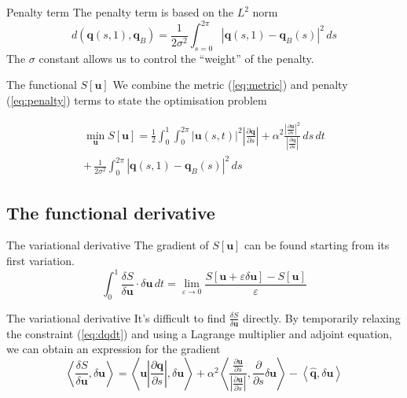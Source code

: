 \documentclass{beamer}
\newcommand{\eq}[1]{(\ref{eq:#1})}
\newcommand{\vect}[1]{\ensuremath{\mathbf{#1}}}
\newcommand{\hvect}[1]{\ensuremath{\hat{\vect{#1}}}}
\newcommand{\pp}[2]{\frac{\partial #1}{\partial #2}}
\newcommand{\vv}[2]{\frac{\delta #1}{\delta #2}}
\newcommand{\angles}[1]{\left\langle #1 \right\rangle}
\newcommand{\eps}{\varepsilon}
\begin{document}
\begin{frame}{Penalty term}
The penalty term is based on the $L^2$ norm
\begin{equation}
  \label{eq:penalty}
  d(\vect q(s,1),\vect q_B) = \frac{1}{2\sigma^2}\int^{2\pi}_{s=0}\left| \vect q(s,1) -
    \vect q_B(s)\right|^2\,ds
\end{equation}
The $\sigma$ constant allows us to control the ``weight'' of the penalty.
\end{frame}



\begin{frame}{The functional $S[\vect u]$}
We combine the metric \eq{metric} and penalty \eq{penalty} terms to
state the optimisation problem

\begin{equation}
  \begin{split}
  \min_{\vect u} S[\vect u] = \frac{1}{2} \int^{1}_{0} \int^{2\pi}_{0}\left| \vect u(s,t) \right|^2 
  \left| \frac{\partial \vect q}{\partial s} \right|  + 
  \alpha^2 \frac{ 
    \left| \frac{\partial \vect u}{\partial s}\right|^2}{
    \left| \frac{\partial \vect q}{\partial s}\right|} \,ds\,dt \\
  +\, \frac{1}{2\sigma^2}\int^{2\pi}_{0}\left| \vect q(s,1) - \vect q_B(s)\right|^2\,ds \label{eq:S}
\end{split}
\end{equation}

\end{frame}

\subsection{The functional derivative}
\begin{frame}{The variational derivative}
The gradient of $S[\vect u]$ can be found starting from its first variation.
\begin{equation}
  \label{eq:lim_dS}
  \int^1_0 \vv{S}{\vect u}\cdot \delta \vect u\,dt = 
  \lim_{\eps \rightarrow 0} \frac{S[\vect u + \eps \delta \vect u] - S[\vect u]}{\eps}
\end{equation}
\end{frame}

\begin{frame}{The variational derivative}
It's difficult to find $\vv{S}{\vect u}$ directly. By temporarily relaxing the constraint \eq{dqdt} and using a Lagrange multiplier and adjoint equation, we can obtain an expression for the gradient
\begin{equation}
  \label{eq:dSdu-deltau}
  \angles{\vv{S}{\vect u}, \delta \vect u} = \angles{\vect u \left|\pp{\vect q}{s}\right|,\delta \vect u} 
  + \alpha^2 \angles{\frac{\pp{\vect u}{s}}{\left|\pp{\vect u}{s}\right|},\pp{}{s}\delta \vect u}
    - \angles{\hvect q,\delta \vect u}
\end{equation}
\end{frame}
\end{document}

